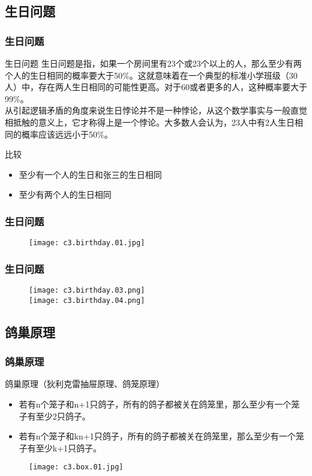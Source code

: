 \subsection{生日问题}
\begin{frame}
  \frametitle{生日问题}
  \begin{block}{生日问题}
生日问题是指，如果一个房间里有23个或23个以上的人，那么至少有两个人的生日相同的概率要大于50\%。这就意味着在一个典型的标准小学班级（30人）中，存在两人生日相同的可能性更高。对于60或者更多的人，这种概率要大于99\%。\\
\vspace{0.3em}
从引起逻辑矛盾的角度来说生日悖论并不是一种悖论，从这个数学事实与一般直觉相抵触的意义上，它才称得上是一个悖论。大多数人会认为，23人中有2人生日相同的概率应该远远小于50\%。
  \end{block}
  \pause
  \begin{block}{比较}
    \begin{itemize}
      \item 至少有一个人的生日和张三的生日相同
      \item 至少有两个人的生日相同
    \end{itemize}
  \end{block}
\end{frame}

\begin{frame}
  \frametitle{生日问题}
  \begin{figure}
    \centering
    \texttt{[image: c3.birthday.01.jpg]}
  \end{figure}
\end{frame}

\begin{frame}
  \frametitle{生日问题}
  \begin{figure}
    \centering
    \texttt{[image: c3.birthday.03.png]}\\
    \texttt{[image: c3.birthday.04.png]}
  \end{figure}
\end{frame}

\subsection{鸽巢原理}
\begin{frame}
  \frametitle{鸽巢原理}
  \begin{block}{鸽巢原理（狄利克雷抽屉原理、鸽笼原理）}
    \begin{itemize}
      \item 若有n个笼子和n+1只鸽子，所有的鸽子都被关在鸽笼里，那么至少有一个笼子有至少2只鸽子。
      \item 若有n个笼子和kn+1只鸽子，所有的鸽子都被关在鸽笼里，那么至少有一个笼子有至少k+1只鸽子。
    \end{itemize}
  \end{block}
  \vspace{-0.5em}
  \begin{figure}
    \centering
    \texttt{[image: c3.box.01.jpg]}
  \end{figure}
\end{frame}

